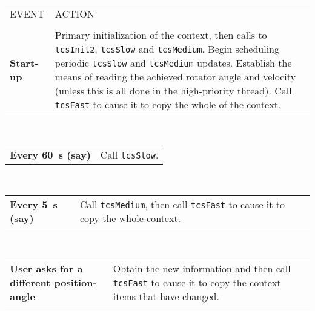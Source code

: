 \documentclass[12pt,fleqn,twoside]{article}
\renewcommand{\_}{{\tt\char'137}}     %
\begin{document}
\begin{center}
\begin{tabular}{p{27ex}p{48ex}}
  EVENT                      & ACTION \\ \\

  \raggedright {\bf Start-up}
                               & \raggedright Primary
                               initialization of the context,
                               then calls to {\tt tcsInit2},
                               {\tt tcsSlow} and {\tt tcsMedium}.
                               Begin scheduling periodic
                               {\tt tcsSlow} and {\tt tcsMedium} updates.
                               Establish the means of reading the
                               achieved rotator angle and
                               velocity (unless this is all done in
                               the high-priority thread).  Call
                               {\tt tcsFast} to cause it to copy the
                               whole of the context. \\
\end{tabular}
\\[\medskipamount]
\begin{tabular}{p{27ex}p{48ex}}
  \raggedright {\bf Every 60~s (say)}
                            & \raggedright Call {\tt tcsSlow}. \\
\end{tabular}
\\[\medskipamount]
\begin{tabular}{p{27ex}p{48ex}}
  \raggedright {\bf Every 5~s (say)}
                             & \raggedright Call {\tt tcsMedium}, then
                               call {\tt tcsFast}
                               to cause it to copy the whole
                               context. \\
\end{tabular}
\\[\medskipamount]
\begin{tabular}{p{27ex}p{48ex}}
  \raggedright {\bf User asks
  for a different
  position-angle}            & \raggedright Obtain the new
                               information and then
                               call {\tt tcsFast} to cause it to copy the
                               context items that have changed. \\
\end{tabular}
\\[\medskipamount]
\begin{tabular}{p{27ex}p{48ex}}

\end{tabular}
\end{center}
\end{document}

